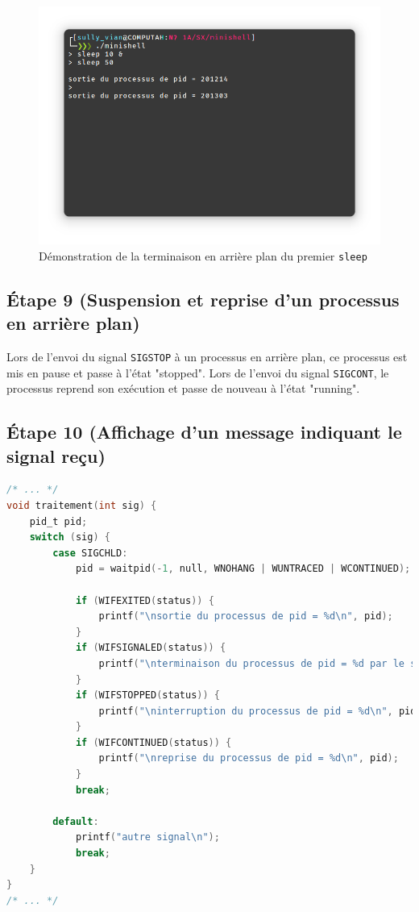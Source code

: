 \documentclass{article}
\begin{document}
\begin{figure}[H]
    \centering
    \includegraphics[width=\textwidth]{./resources/E8.png}
    \caption{Démonstration de la terminaison en arrière plan du premier \texttt{sleep}}
    \label{fig:E8}
\end{figure}

\subsection*{Étape 9 (Suspension et reprise d'un processus en arrière plan)}

Lors de l'envoi du signal \texttt{SIGSTOP} à un processus en arrière plan, ce processus est mis en pause et passe à l'état "stopped". Lors de l'envoi du signal \texttt{SIGCONT}, le processus reprend son exécution et passe de nouveau à l'état "running".

\subsection*{Étape 10 (Affichage d'un message indiquant le signal reçu)}

\begin{lstlisting}[language=C, caption=ajout de la question 10]
/* ... */
void traitement(int sig) {
    pid_t pid;
    switch (sig) {
        case SIGCHLD:
            pid = waitpid(-1, null, WNOHANG | WUNTRACED | WCONTINUED);

            if (WIFEXITED(status)) {
                printf("\nsortie du processus de pid = %d\n", pid);
            }
            if (WIFSIGNALED(status)) {
                printf("\nterminaison du processus de pid = %d par le signal %d\n", pid, sig);
            }
            if (WIFSTOPPED(status)) {
                printf("\ninterruption du processus de pid = %d\n", pid);
            }
            if (WIFCONTINUED(status)) {
                printf("\nreprise du processus de pid = %d\n", pid);
            }
            break;

        default:
            printf("autre signal\n");
            break;
    }
}
/* ... */
\end{lstlisting}
\end{document}
